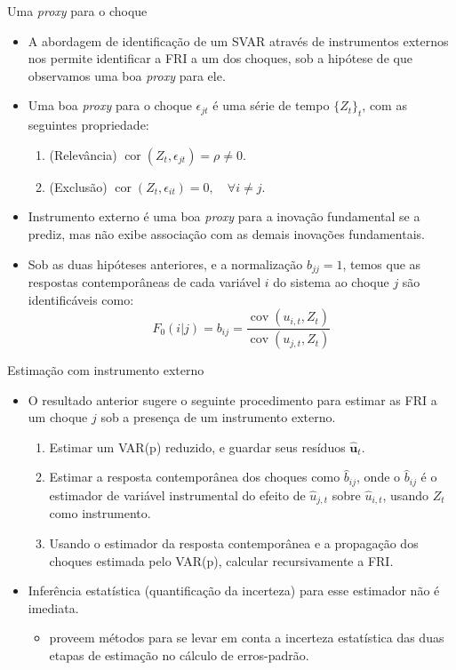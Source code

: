 \documentclass[11pt]{beamer}
\begin{document}
\begin{frame}{Uma \textit{proxy} para o choque}
	\begin{itemize}
		\item A abordagem de identificação de um SVAR através de instrumentos externos nos permite identificar a {\color{blue}FRI a um dos choques}, sob a hipótese de que observamos uma {\color{blue}boa \textit{proxy} para ele}. 
		\item Uma boa \textit{proxy} para o choque $\epsilon_{jt}$ é uma série de tempo $\{Z_t\}_t$, com as seguintes propriedade:
		\begin{enumerate}
			\item 	(Relevância)	$\operatorname{cor}(Z_t, \epsilon_{jt}) = \rho \neq 0$.
			\item (Exclusão) $\operatorname{cor}(Z_t, \epsilon_{it})  = 0, \quad \forall i \neq j$.
		\end{enumerate}
	\item Instrumento externo é uma boa \textit{proxy} para a inovação fundamental se a prediz, mas não exibe associação com as demais inovações fundamentais.
	\item Sob as duas hipóteses anteriores, e a normalização $b_{jj} = 1$, temos que as respostas contemporâneas de cada variável $i$ do sistema ao choque $j$ são identificáveis como:
	$$F_{0}(i|j) = b_{ij} = \frac{\operatorname{cov}(u_{i,t}, Z_{t})}{\operatorname{cov}(u_{j,t}, Z_{t})} $$
	\end{itemize}
\end{frame}

\begin{frame}{Estimação com instrumento externo}
	\begin{itemize}
		\item O resultado anterior sugere o seguinte procedimento para estimar as FRI a um choque $j$ sob a presença de um instrumento externo.
		\begin{enumerate}
			\item Estimar um VAR(p) reduzido, e guardar seus resíduos $\hat{\boldsymbol{u}}_t$.
			\item Estimar a resposta contemporânea dos choques como $\hat b_{ij}$, onde  o $\hat b_{ij}$ é o estimador de variável instrumental do efeito de $\hat u_{j,t}$ sobre $\hat u_{i,t}$, usando $Z_t$ como instrumento.
			\item Usando o estimador da resposta contemporânea e a propagação dos choques estimada pelo VAR(p), calcular recursivamente a FRI.
		\end{enumerate}
		\item Inferência estatística (quantificação da incerteza) para esse estimador não é imediata.
		\begin{itemize}
			\item \citet{Stock2018} proveem métodos para se levar em conta a incerteza estatística das duas etapas de estimação no cálculo de erros-padrão.
		\end{itemize}		
	\end{itemize}
\end{frame}
\end{document}
